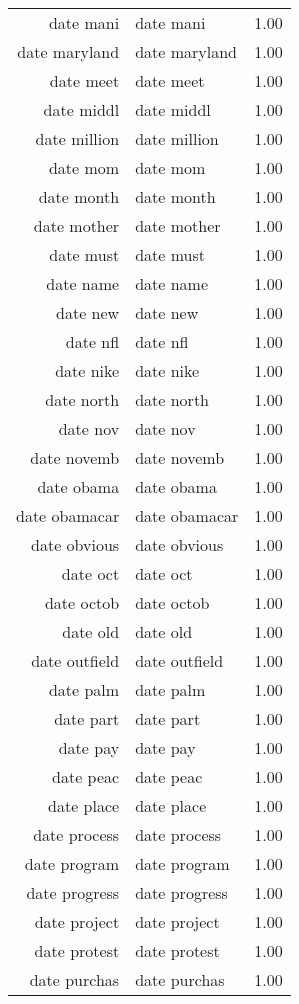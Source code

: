 \begin{table}[ht]
\begin{tabular}{rlr}
  date mani & date mani & 1.00 \\ 
  date maryland & date maryland & 1.00 \\ 
  date meet & date meet & 1.00 \\ 
  date middl & date middl & 1.00 \\ 
  date million & date million & 1.00 \\ 
  date mom & date mom & 1.00 \\ 
  date month & date month & 1.00 \\ 
  date mother & date mother & 1.00 \\ 
  date must & date must & 1.00 \\ 
  date name & date name & 1.00 \\ 
  date new & date new & 1.00 \\ 
  date nfl & date nfl & 1.00 \\ 
  date nike & date nike & 1.00 \\ 
  date north & date north & 1.00 \\ 
  date nov & date nov & 1.00 \\ 
  date novemb & date novemb & 1.00 \\ 
  date obama & date obama & 1.00 \\ 
  date obamacar & date obamacar & 1.00 \\ 
  date obvious & date obvious & 1.00 \\ 
  date oct & date oct & 1.00 \\ 
  date octob & date octob & 1.00 \\ 
  date old & date old & 1.00 \\ 
  date outfield & date outfield & 1.00 \\ 
  date palm & date palm & 1.00 \\ 
  date part & date part & 1.00 \\ 
  date pay & date pay & 1.00 \\ 
  date peac & date peac & 1.00 \\ 
  date place & date place & 1.00 \\ 
  date process & date process & 1.00 \\ 
  date program & date program & 1.00 \\ 
  date progress & date progress & 1.00 \\ 
  date project & date project & 1.00 \\ 
  date protest & date protest & 1.00 \\ 
  date purchas & date purchas & 1.00 \\ 

\end{tabular}
\end{table}
